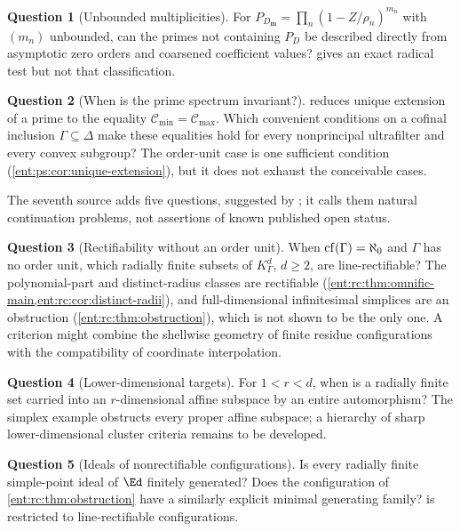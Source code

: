 \documentclass[11pt]{article}
\theoremstyle{plain}
\theoremstyle{plain}
\theoremstyle{plain}
\theoremstyle{definition}
\theoremstyle{definition}
\theoremstyle{definition}
\theoremstyle{definition}
\newtheorem{question}[question]{Question}
\theoremstyle{remark}
\newcommand{\K}{K_\Gamma}\newcommand{\KD}{K_\Delta}
\begin{document}
\begin{question}[Unbounded multiplicities]\label{ent:ps:q:unbounded}
For $P_{D_{\mathbf m}}=\prod_n(1-Z/\rho_n)^{m_n}$ with $(m_n)$ unbounded, can
the primes not containing $P_D$ be described directly from asymptotic zero
orders and coarsened coefficient values?  gives
an exact radical test but not that classification.
\end{question}

\begin{question}[When is the prime spectrum invariant?]
\label{ent:ps:q:invariance}
 reduces unique extension of a prime to the
equality $\mathcal C_{\min}=\mathcal C_{\max}$. Which convenient conditions on
a cofinal inclusion $\Gamma\subseteq\Delta$ make these equalities hold for
every nonprincipal ultrafilter and every convex subgroup? The order-unit case
is one sufficient condition (\cref{ent:ps:cor:unique-extension}), but it does
not exhaust the conceivable cases.
\end{question}

The seventh source adds five questions, suggested by
; it calls them natural
continuation problems, not assertions of known published open status.

\begin{question}[Rectifiability without an order unit]\label{ent:rc:q:criterion}
When $\operatorname{cf}(\Gamma)=\aleph_0$ and $\Gamma$ has no order unit, which radially
finite subsets of $\K^d$, $d\ge2$, are line-rectifiable? The polynomial-part
and distinct-radius classes are rectifiable
(\cref{ent:rc:thm:omnific-main,ent:rc:cor:distinct-radii}), and
full-dimensional infinitesimal simplices are an obstruction
(\cref{ent:rc:thm:obstruction}), which is not shown to be the only one. A
criterion might combine the shellwise geometry of finite residue
configurations with the compatibility of coordinate interpolation.
\end{question}

\begin{question}[Lower-dimensional targets]\label{ent:rc:q:targets}
For $1<r<d$, when is a radially finite set carried into an $r$-dimensional
affine subspace by an entire automorphism? The simplex example obstructs every
proper affine subspace; a hierarchy of sharp lower-dimensional cluster
criteria remains to be developed.
\end{question}

\begin{question}[Ideals of nonrectifiable configurations]\label{ent:rc:q:ideals}
Is every radially finite simple-point ideal of $\Ed$ finitely generated? Does
the configuration of \cref{ent:rc:thm:obstruction} have a similarly explicit
minimal generating family?  is restricted to
line-rectifiable configurations.
\end{question}
\end{document}

